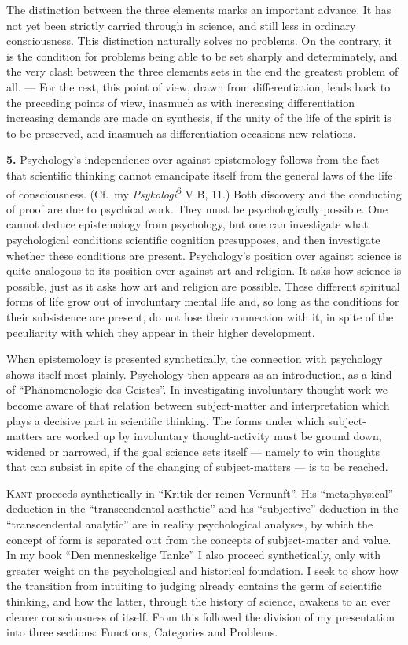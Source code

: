 \documentclass[12pt]{book}
\newcommand{\hnum}[1]{\textbf{#1.}\enspace}
\newcommand{\opage}[1]{\marginnote{\footnotesize\textit{[#1]}}}
\begin{document}
The distinction between the three elements marks an important advance. It has
not yet been strictly carried through in science, and still less in ordinary
consciousness. This distinction naturally solves no problems. On the contrary,
it is the condition for problems being able to be set sharply and determinately,
and the very clash between the three elements sets in the end the greatest
problem of all. --- For the rest, this point of view, drawn from
differentiation, leads back to the preceding points of view, inasmuch as with
increasing differentiation increasing demands are made on synthesis, if the
unity of the life of the spirit is to be preserved, and inasmuch as
differentiation occasions new relations.

\hnum{5} Psychology's independence over against epistemology follows from the
fact that scientific thinking cannot emancipate itself from the general laws of
the life of consciousness. (Cf.\ my \textit{Psykologi}\textsuperscript{6} V B,
11.) Both discovery and the conducting of proof are due to psychical work. They
must be psychologically possible. One cannot deduce epistemology from
psychology, but one can investigate what psychological conditions scientific
cognition presupposes, and then investigate whether these conditions are
present. Psychology's position over against science is quite analogous to its
position over against art and religion. It asks how science is possible, just as
it asks how art and religion are possible. These different spiritual forms of
life grow out of involuntary mental life and, so long as the conditions for
their subsistence are present, do not lose their connection with it, in spite of
the peculiarity with which they appear in their higher development.

When epistemology is presented synthetically, the connection with psychology
shows itself most plainly. Psychology then appears as an introduction, as a kind
of ``Phänomenologie des Geistes''. In investigating involuntary thought-work we
become aware of that relation between subject-matter and interpretation which
plays a decisive part in scientific thinking. The forms under which
subject-matters \opage{14}are worked up by involuntary thought-activity must be ground
down, widened or narrowed, if the goal science sets itself --- namely to win
thoughts that can subsist in spite of the changing of subject-matters --- is to
be reached.

\textsc{Kant} proceeds synthetically in ``Kritik der reinen Vernunft''. His
``metaphysical'' deduction in the ``transcendental aesthetic'' and his
``subjective'' deduction in the ``transcendental analytic'' are in reality
psychological analyses, by which the concept of form is separated out from the
concepts of subject-matter and value. In my book ``Den menneskelige Tanke'' I
also proceed synthetically, only with greater weight on the psychological and
historical foundation. I seek to show how the transition from intuiting to
judging already contains the germ of scientific thinking, and how the latter,
through the history of science, awakens to an ever clearer consciousness of
itself. From this followed the division of my presentation into three sections:
Functions, Categories and Problems.
\end{document}
